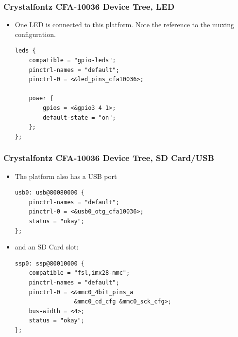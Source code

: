 \begin{frame}[fragile]
  \frametitle{Crystalfontz CFA-10036 Device Tree, LED}
\begin{itemize}
\item One LED is connected to this platform. Note the reference to the
   muxing configuration.
  \begin{block}{}
    \begin{verbatim}
leds {
    compatible = "gpio-leds";
    pinctrl-names = "default";
    pinctrl-0 = <&led_pins_cfa10036>;

    power {
        gpios = <&gpio3 4 1>;
        default-state = "on";
    };
};
    \end{verbatim}
    \end{block}
  \end{itemize}
\end{frame}

\begin{frame}[fragile]
  \frametitle{Crystalfontz CFA-10036 Device Tree, SD Card/USB}
  \begin{itemize}
  \item The platform also has a USB port
    \begin{block}{}
      \begin{verbatim}
usb0: usb@80080000 {
    pinctrl-names = "default";
    pinctrl-0 = <&usb0_otg_cfa10036>;
    status = "okay";
};
      \end{verbatim}
    \end{block}
  \item and an SD Card slot:
    \begin{block}{}
      \begin{verbatim}
ssp0: ssp@80010000 {
    compatible = "fsl,imx28-mmc";
    pinctrl-names = "default";
    pinctrl-0 = <&mmc0_4bit_pins_a
                 &mmc0_cd_cfg &mmc0_sck_cfg>;
    bus-width = <4>;
    status = "okay";
};
    \end{verbatim}
    \end{block}
  \end{itemize}
\end{frame}

